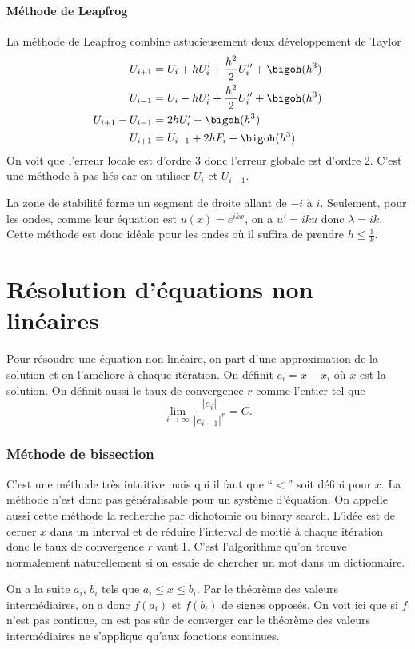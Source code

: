 \subsection{Méthode de Leapfrog}
La méthode de Leapfrog combine astucieusement deux développement de Taylor
\begin{align*}
  U_{i+1} & = U_i + hU_i' + \frac{h^2}{2}U_i'' + \bigoh(h^3)\\
  U_{i-1} & = U_i - hU_i' + \frac{h^2}{2}U_i'' + \bigoh(h^3)\\
  U_{i+1} - U_{i-1} & = 2hU_i' + \bigoh(h^3)\\
  U_{i+1} & = U_{i-1} + 2hF_i + \bigoh(h^3)
\end{align*}
On voit que l'erreur locale est d'ordre 3 donc l'erreur
globale est d'ordre 2.
C'est une méthode à pas liés car on utiliser $U_i$ et $U_{i-1}$.

La zone de stabilité forme un segment de droite allant de $-i$ à $i$.
Seulement, pour les ondes, comme leur équation
est $u(x) = e^{ikx}$, on a $u' = iku$ donc $\lambda = ik$.
Cette méthode est donc idéale pour les ondes où il suffira de prendre
$h \leq \frac{1}{k}$.

\part{Résolution d'équations non linéaires}
Pour résoudre une équation non linéaire,
on part d'une approximation de la solution et on l'améliore
à chaque itération.
On définit
$e_i = x - x_i$ où $x$ est la solution.
On définit aussi le taux de convergence $r$ comme l'entier tel que
\[ \lim_{i\to\infty} \frac{|e_i|}{|e_{i-1}|^r} = C. \]

\section{Méthode de bissection}
C'est une méthode très intuitive mais qui il faut que ``$<$'' soit défini
pour $x$.
La méthode n'est donc pas généralisable pour un système d'équation.
On appelle aussi cette méthode la recherche par dichotomie ou
binary search.
L'idée est de cerner $x$ dans un interval et de réduire l'interval de moitié
à chaque itération donc le taux de convergence $r$ vaut 1.
C'est l'algorithme qu'on trouve normalement naturellement si on essaie
de chercher un mot dans un dictionnaire.

On a la suite $a_i$, $b_i$ tels que $a_i \leq x \leq b_i$.
Par le théorème des valeurs intermédiaires, on a donc
$f(a_i)$ et $f(b_i)$ de signes opposés.
On voit ici que si $f$ n'est pas continue,
on est pas sûr de converger car le théorème des valeurs
intermédiaires ne s'applique qu'aux fonctions continues.

